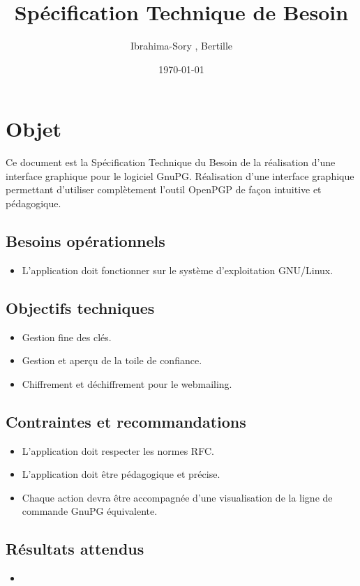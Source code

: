 \documentclass{univ-projet}
\title{Spécification Technique de Besoin}
\author{Ibrahima-Sory \bsc{Barry}, Bertille \bsc{Bouillie}}
\date{\today}
\begin{document}
\maketitle
\newpage
\tableofcontents
\newpage

\section{Objet}

Ce document est la Spécification Technique du Besoin de la réalisation d'une interface graphique pour le logiciel GnuPG.
Réalisation d'une interface graphique permettant d'utiliser complètement l'outil OpenPGP
de façon intuitive et pédagogique.

\subsection{Besoins opérationnels}
\begin{itemize}
 \item L'application doit fonctionner sur le système d'exploitation GNU/Linux.
\end{itemize}

\subsection{Objectifs techniques}
\begin{itemize}
 \item Gestion fine des clés.
 \item Gestion et aperçu de la toile de confiance.
 \item Chiffrement et déchiffrement pour le webmailing.
\end{itemize}

\subsection{Contraintes et recommandations}
\begin{itemize}
 \item L'application doit respecter les normes RFC.
 \item L'application doit être pédagogique et précise.
 \item Chaque action devra être accompagnée d'une visualisation de la ligne de commande GnuPG équivalente.
\end{itemize}

\subsection{Résultats attendus}
\begin{itemize}
 \item 
\end{itemize}
\end{document}
